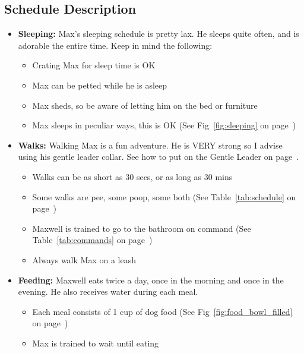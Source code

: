 \documentclass[pdftex,12pt]{article}
\begin{document}
\pagebreak

\subsection{Schedule Description}
\begin{itemize}\label{itm:schedule}
    \item \textbf{Sleeping:} Max's sleeping schedule is pretty lax. He sleeps 
        quite often, and is adorable the entire time. Keep in mind the following:
        \begin{itemize}
            \item Crating Max for sleep time is OK
            \item Max can be petted while he is asleep
            \item Max sheds, so be aware of letting him on the bed or furniture
            \item Max sleeps in peculiar ways, this is OK
                (See Fig~\ref{fig:sleeping} on page~\pageref{fig:sleeping})
        \end{itemize}
    \item \textbf{Walks:} Walking Max is a fun adventure. He is VERY strong so I
        advise using his gentle leader collar. See how to put on the Gentle Leader
        on page~\pageref{itm:how_to_gentle_leader}.
        \begin{itemize}
            \item Walks can be as short as 30 secs, or as long as 30 mins
            \item Some walks are pee, some poop, some both
                (See Table~\ref{tab:schedule} on page~\pageref{tab:schedule})
            \item Maxwell is trained to go to the bathroom on command
                (See Table~\ref{tab:commands} on page~\pageref{tab:commands})
            \item Always walk Max on a leash
        \end{itemize}
    \item \textbf{Feeding:} Maxwell eats twice a day, once in the morning and
        once in the evening. He also receives water during each meal.
        \begin{itemize}
            \item Each meal consists of 1 cup of dog food
                (See Fig~\ref{fig:food_bowl_filled} on
                page~\pageref{fig:food_bowl_filled})
            \item Max is trained to wait until eating

\end{itemize}
\end{itemize}
\end{document}
